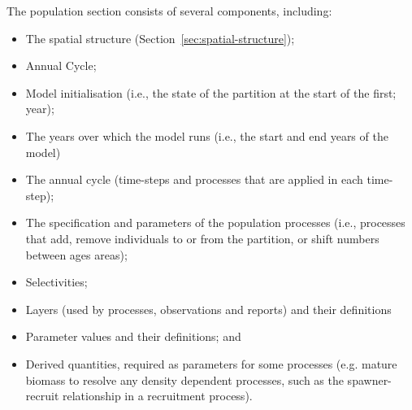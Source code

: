 The population section consists of several components, including:
\begin{itemize}
  \item The spatial structure (Section~\ref{sec:spatial-structure});
  \item Annual Cycle;
  \item Model initialisation (i.e., the state of the partition at the start of the first; year);
  \item The years over which the model runs (i.e., the start and end years of the model)
  \item The annual cycle (time-steps and processes that are applied in each time-step);
  \item The specification and parameters of the population processes (i.e., processes that add, remove individuals to or from the partition, or shift numbers between ages areas);
  \item Selectivities;
  \item Layers (used by processes, observations and reports) and their definitions
  \item Parameter values and their definitions; and
  \item Derived quantities, required as parameters for some processes (e.g. mature biomass to resolve any density dependent processes, such as the spawner-recruit relationship in a recruitment process).
\end{itemize}
%
%
